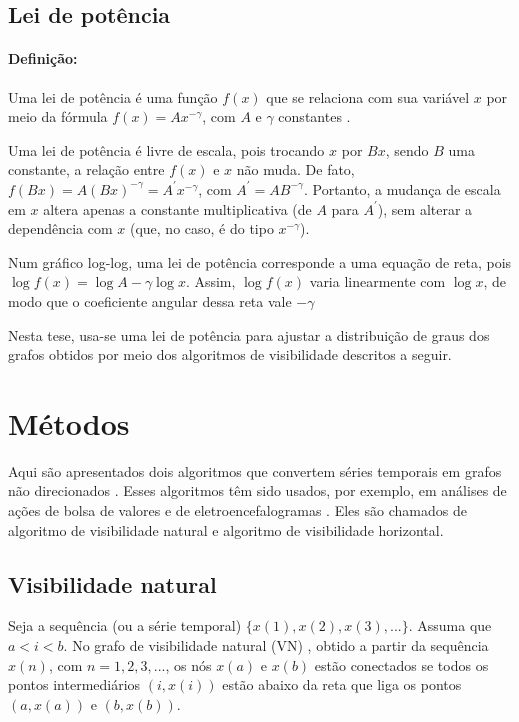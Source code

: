 \documentclass[12pt,a4paper,fleqn]{report}
\begin{document}
\subsection{Lei de potência}

\paragraph*{Definição:} Uma lei de potência é uma função $f(x)$ que se relaciona com sua variável $x$ por meio da fórmula $f(x)=A x^{-\gamma}$, com $A$ e $\gamma$ constantes \cite{a83}.

Uma lei de potência é livre de escala, pois trocando $x$ por $Bx$, sendo $B$ uma constante, a relação entre $f(x)$ e $x$ não muda. De fato, $f(Bx)=A(Bx)^{-\gamma}=A^{'}x^{-\gamma}$, com $A^{'}=AB^{-\gamma}$. Portanto, a mudança de escala em $x$ altera apenas a constante multiplicativa (de $A$ para $A^{'}$), sem alterar a dependência com $x$ (que, no caso, é do tipo $x^{-\gamma}$).

Num gráfico log-log,
uma lei de potência corresponde a uma equação de reta, pois 
$\log f(x) = \log A - \gamma \log x$. Assim, $\log f(x)$ varia linearmente com $\log x$, de modo que o coeficiente angular dessa reta vale $-\gamma$

Nesta tese, usa-se uma lei de potência para ajustar a distribuição de graus dos grafos obtidos 
por meio dos algoritmos de visibilidade descritos a seguir. 


\section{Métodos}

Aqui são apresentados dois algoritmos que convertem
séries temporais em grafos não direcionados \cite{a14,a13}.
Esses algoritmos têm sido usados, por exemplo, em análises de ações de bolsa de valores 
\cite{a94} e de  eletroencefalogramas \cite{b01}. Eles são chamados de algoritmo de visibilidade natural e algoritmo de visibilidade horizontal.

\subsection{Visibilidade natural}

Seja a sequência (ou a série temporal) $\{x(1), x(2), x(3),...\}$. Assuma que $a < i < b$. No grafo de visibilidade natural (VN)
\cite{a14}, obtido a partir da sequência $x(n)$, com $n=1,2,3,...$,
os nós $x(a)$ e $x(b)$ estão conectados se todos os pontos intermediários $(i,x(i))$ estão abaixo da reta
que liga os pontos $(a,x(a))$ e $(b,x(b))$. 
\end{document}
